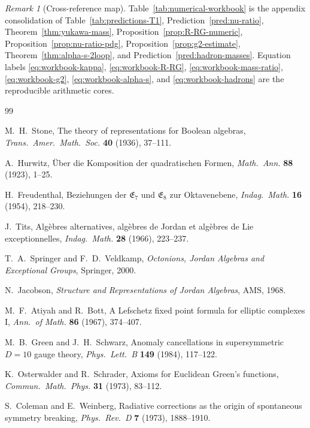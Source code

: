 \documentclass[11pt]{article}
\theoremstyle{plain}
\theoremstyle{definition}
\theoremstyle{remark}
\newtheorem{remark}[theorem]{Remark}
\numberwithin{equation}{section}
\begin{document}
\begin{remark}[Cross-reference map]
Table~\ref{tab:numerical-workbook} is the appendix consolidation of
Table~\ref{tab:predictions-T1}, Prediction~\ref{pred:nu-ratio},
Theorem~\ref{thm:yukawa-mass}, Proposition~\ref{prop:R-RG-numeric},
Proposition~\ref{prop:nu-ratio-pdg}, Proposition~\ref{prop:g2-estimate},
Theorem~\ref{thm:alpha-s-2loop}, and Prediction~\ref{pred:hadron-masses}.
Equation labels \eqref{eq:workbook-kappa}, \eqref{eq:workbook-R-RG},
\eqref{eq:workbook-mass-ratio}, \eqref{eq:workbook-g2},
\eqref{eq:workbook-alpha-s}, and \eqref{eq:workbook-hadrons} are the reproducible
arithmetic cores.
\end{remark}%
\begin{thebibliography}{99}

M.~H.~Stone,
The theory of representations for Boolean algebras,
\emph{Trans.\ Amer.\ Math.\ Soc.} \textbf{40} (1936), 37--111.

A.~Hurwitz,
\"Uber die Komposition der quadratischen Formen,
\emph{Math.\ Ann.} \textbf{88} (1923), 1--25.

H.~Freudenthal,
Beziehungen der $\mathfrak{E}_7$ und $\mathfrak{E}_8$ zur Oktavenebene,
\emph{Indag.\ Math.} \textbf{16} (1954), 218--230.

J.~Tits,
Alg\`ebres alternatives, alg\`ebres de Jordan et alg\`ebres de Lie
exceptionnelles,
\emph{Indag.\ Math.} \textbf{28} (1966), 223--237.

T.~A.~Springer and F.~D.~Veldkamp,
\emph{Octonions, Jordan Algebras and Exceptional Groups},
Springer, 2000.

N.~Jacobson,
\emph{Structure and Representations of Jordan Algebras},
AMS, 1968.

M.~F.~Atiyah and R.~Bott,
A Lefschetz fixed point formula for elliptic complexes I,
\emph{Ann.\ of Math.} \textbf{86} (1967), 374--407.

M.~B.~Green and J.~H.~Schwarz,
Anomaly cancellations in supersymmetric $D=10$ gauge theory,
\emph{Phys.\ Lett.\ B} \textbf{149} (1984), 117--122.

K.~Osterwalder and R.~Schrader,
Axioms for Euclidean Green's functions,
\emph{Commun.\ Math.\ Phys.} \textbf{31} (1973), 83--112.

S.~Coleman and E.~Weinberg,
Radiative corrections as the origin of spontaneous symmetry breaking,
\emph{Phys.\ Rev.\ D} \textbf{7} (1973), 1888--1910.


\end{thebibliography}
\end{document}
